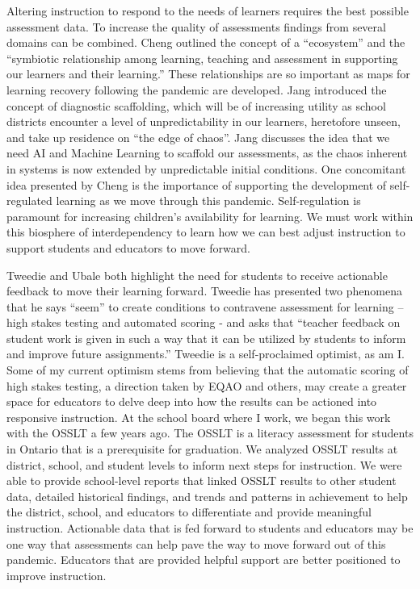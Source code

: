 \documentclass[
]{book}
\begin{document}
Altering instruction to respond to the needs of learners requires the best possible assessment data. To increase the quality of assessments findings from several domains can be combined. Cheng outlined the concept of a ``ecosystem'' and the ``symbiotic relationship among learning, teaching and assessment in supporting our learners and their learning.'' These relationships are so important as maps for learning recovery following the pandemic are developed. Jang introduced the concept of diagnostic scaffolding, which will be of increasing utility as school districts encounter a level of unpredictability in our learners, heretofore unseen, and take up residence on ``the edge of chaos''. Jang discusses the idea that we need AI and Machine Learning to scaffold our assessments, as the chaos inherent in systems is now extended by unpredictable initial conditions. One concomitant idea presented by Cheng is the importance of supporting the development of self-regulated learning as we move through this pandemic. Self-regulation is paramount for increasing children's availability for learning. We must work within this biosphere of interdependency to learn how we can best adjust instruction to support students and educators to move forward.

Tweedie and Ubale both highlight the need for students to receive actionable feedback to move their learning forward. Tweedie has presented two phenomena that he says ``seem'' to create conditions to contravene assessment for learning -- high stakes testing and automated scoring - and asks that ``teacher feedback on student work is given in such a way that it can be utilized by students to inform and improve future assignments.'' Tweedie is a self-proclaimed optimist, as am I. Some of my current optimism stems from believing that the automatic scoring of high stakes testing, a direction taken by EQAO and others, may create a greater space for educators to delve deep into how the results can be actioned into responsive instruction. At the school board where I work, we began this work with the OSSLT a few years ago. The OSSLT is a literacy assessment for students in Ontario that is a prerequisite for graduation. We analyzed OSSLT results at district, school, and student levels to inform next steps for instruction. We were able to provide school-level reports that linked OSSLT results to other student data, detailed historical findings, and trends and patterns in achievement to help the district, school, and educators to differentiate and provide meaningful instruction. Actionable data that is fed forward to students and educators may be one way that assessments can help pave the way to move forward out of this pandemic. Educators that are provided helpful support are better positioned to improve instruction.
\end{document}
